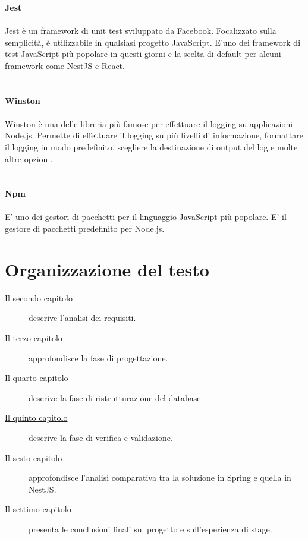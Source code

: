 \\\\\\
\textbf{Jest}
\\\\
Jest è un framework di unit test sviluppato da Facebook. Focalizzato sulla semplicità, è utilizzabile in qualsiasi
progetto JavaScript. E'uno dei framework di test JavaScript più popolare in questi giorni e la scelta di default 
per alcuni framework come NestJS e React.
\\\\\\
\textbf{Winston}
\\\\
Winston è una delle libreria più famose per effettuare il logging su applicazioni Node.js. Permette di effettuare il logging
su più livelli di informazione, formattare il logging in modo predefinito, scegliere la destinazione di output del log e molte 
altre opzioni.
\\\\\\
\textbf{Npm}
\\\\
E' uno dei gestori di pacchetti per il linguaggio JavaScript più popolare. E' il gestore di pacchetti predefinito 
per Node.js.

\section{Organizzazione del testo}

\begin{description}
    \item[{\hyperref[cap:analisi-requisiti]{Il secondo capitolo}}] descrive l'analisi dei requisiti.
    
    \item[{\hyperref[cap:progettazione]{Il terzo capitolo}}] approfondisce la fase di progettazione.
    
    \item[{\hyperref[cap:ristrutturazione-database]{Il quarto capitolo}}] descrive la fase di ristrutturazione del database.
    
    \item[{\hyperref[cap:verifica-e-validazione]{Il quinto capitolo}}] descrive la fase di verifica e validazione.
    
    \item[{\hyperref[cap:analisi-comparativa]{Il sesto capitolo}}] approfondisce l'analisi comparativa tra la soluzione in Spring e quella in NestJS.
    
    \item[{\hyperref[cap:conclusioni]{Il settimo capitolo}}] presenta le conclusioni finali sul progetto e sull'esperienza di stage.
\end{description}

